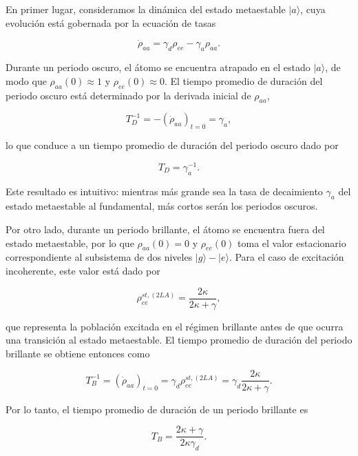\documentclass[12pt]{article}
\newcommand{\ket}[1]{\lvert #1 \rangle}
\begin{document}
En primer lugar, consideramos la dinámica del estado metaestable $\ket{a}$, cuya evolución está gobernada por la ecuación de tasas

\begin{equation}
\dot{\rho}_{aa} = \gamma_d \rho_{ee} - \gamma_a \rho_{aa}.
\end{equation}

Durante un periodo oscuro, el átomo se encuentra atrapado en el estado $\ket{a}$, de modo que $\rho_{aa}(0) \approx 1$ y $\rho_{ee}(0) \approx 0$. El tiempo promedio de duración del periodo oscuro está determinado por la derivada inicial de $\rho_{aa}$,

\begin{equation}
T_D^{-1} = -(\dot{\rho}_{aa})_{t=0} = \gamma_a,
\end{equation}

lo que conduce a un tiempo promedio de duración del periodo oscuro dado por

\begin{equation}
T_D = \gamma_a^{-1}.
\end{equation}

Este resultado es intuitivo: mientras más grande sea la tasa de decaimiento $\gamma_a$ del estado metaestable al fundamental, más cortos serán los periodos oscuros.

Por otro lado, durante un periodo brillante, el átomo se encuentra fuera del estado metaestable, por lo que $\rho_{aa}(0) = 0$ y $\rho_{ee}(0)$ toma el valor estacionario correspondiente al subsistema de dos niveles $\ket{g} - \ket{e}$. Para el caso de excitación incoherente, este valor está dado por

\begin{equation}
\rho_{ee}^{st,(2LA)} = \frac{2\kappa}{2\kappa + \gamma},
\end{equation}

que representa la población excitada en el régimen brillante antes de que ocurra una transición al estado metaestable. El tiempo promedio de duración del periodo brillante se obtiene entonces como

\begin{equation}
T_B^{-1} = (\dot{\rho}_{aa})_{t=0} = \gamma_d \rho_{ee}^{st,(2LA)} = \gamma_d \frac{2\kappa}{2\kappa + \gamma}.
\end{equation}

Por lo tanto, el tiempo promedio de duración de un periodo brillante es

\begin{equation}
T_B = \frac{2\kappa + \gamma}{2\kappa \gamma_d}.
\end{equation}
\end{document}
